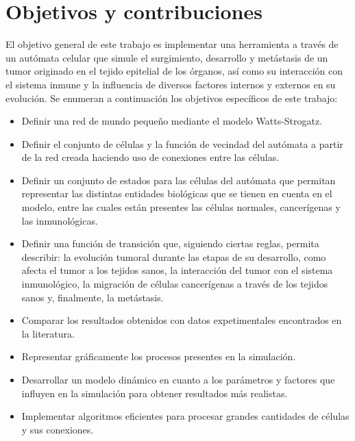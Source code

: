 \section{Objetivos y contribuciones} 
\hspace{.1cm}El objetivo general de este trabajo es implementar una herramienta a trav\'es de un aut\'omata celular que simule el surgimiento, desarrollo y met\'astasis de un tumor originado en el tejido epitelial de los \'organos, as\'i como su interacción con el sistema inmune y la influencia de diversos factores internos y externos en su evoluci\'on. 
Se enumeran a continuaci\'on los objetivos espec\'ificos de este trabajo:
\begin{itemize}
    \item Definir una red de mundo pequeño mediante el modelo Watts-Strogatz.
    \item Definir el conjunto de c\'elulas y la funci\'on de vecindad del aut\'omata a partir de la red creada haciendo uso de conexiones entre las c\'elulas.
    \item Definir un conjunto de estados para las c\'elulas del aut\'omata que permitan representar las distintas entidades biol\'ogicas que se tienen en cuenta en el modelo, entre las cuales est\'an presentes las c\'elulas normales, cancer\'igenas y las inmunol\'ogicas.
    \item Definir una funci\'on de transición que, siguiendo ciertas reglas, permita describir: la evoluci\'on tumoral durante las etapas de su desarrollo, como afecta el tumor a los tejidos sanos, la interacci\'on del tumor con el sistema inmunol\'ogico, la migraci\'on de c\'elulas cancer\'igenas a trav\'es de los tejidos sanos y, finalmente, la met\'astasis.
    \item Comparar los resultados obtenidos con datos expetimentales encontrados en la literatura.
    \item Representar gr\'aficamente los procesos presentes en la simulaci\'on.
    \item Desarrollar un modelo din\'amico en cuanto a los par\'ametros y factores que influyen en la simulaci\'on para obtener resultados m\'as realistas.
    \item Implementar algoritmos eficientes para procesar grandes cantidades de células y sus conexiones.
\end{itemize}